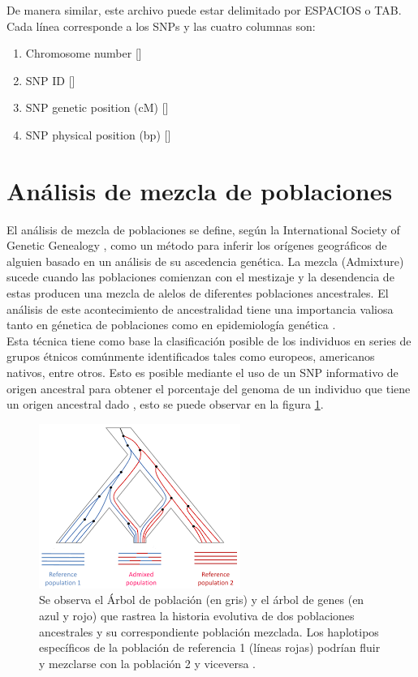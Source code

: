  De manera similar, este archivo puede estar delimitado por ESPACIOS o TAB. Cada l\'inea corresponde a los SNPs y las cuatro columnas son:\\

 
 \begin{enumerate}[1.]
 \item Chromosome number []
 \item SNP ID []
 \item SNP genetic position (cM) []
 \item SNP physical position (bp) []
 \end{enumerate}


 
 \section{An\'alisis de mezcla de poblaciones}

 El an\'alisis de mezcla de poblaciones se define, seg\'un la International Society of Genetic Genealogy \cite{ISGG}, como un m\'etodo para inferir los or\'igenes geogr\'aficos de alguien basado en un an\'alisis de su ascedencia gen\'etica. La mezcla (Admixture) sucede cuando las poblaciones comienzan con el mestizaje y la desendencia de estas producen una mezcla de alelos de diferentes poblaciones ancestrales. El an\'alisis de este acontecimiento de ancestralidad tiene una importancia valiosa tanto en g\'enetica de poblaciones como en epidemiolog\'ia gen\'etica \cite{Line}.\\

 Esta t\'ecnica tiene como base la clasificaci\'on posible de los individuos en series de grupos \'etnicos com\'unmente identificados tales como europeos, americanos nativos, entre otros. Esto es posible mediante el uso de un SNP informativo de origen ancestral para obtener el porcentaje del genoma de un individuo que tiene un origen ancestral dado \cite{Orlando}, esto se puede observar en la figura \ref{fig:adm}.\\

 
\begin{figure}[H]
  \centering
  \includegraphics[scale=0.9]{images.png}
  \caption[\'Arbol de poblaci\'on y \'arbol de genes]{ Se observa el \'Arbol de población (en gris) y el árbol de genes (en azul y rojo) que rastrea la historia evolutiva de dos poblaciones ancestrales y su correspondiente población mezclada. Los haplotipos específicos de la población de referencia 1 (líneas rojas) podrían fluir y mezclarse con la población 2 y viceversa  \cite{Yuan}.}
  \label{fig:adm}
\end{figure}
 



